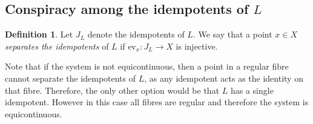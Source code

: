 \documentclass[12pt]{amsart}
\theoremstyle{definition}
\newtheorem{definition}[theorem]{Definition}
\numberwithin{equation}{section}
\newcommand{\ev}{\mathrm{ev}}
\begin{document}
\subsection{Conspiracy among the idempotents of $L$}

\begin{definition}
Let $J_L$ denote the idempotents of $L$.  We say that a point $x\in X$ {\em separates the idempotents} of $L$ if $\ev_x:J_L\to X$ is injective.
\end{definition}
Note that if the system is not equicontinuous, then a 
point in a regular fibre cannot separate the idempotents of $L$, as  any idempotent acts as the identity on that fibre. Therefore, 
the only other option would be that $L$ has a single idempotent. However in this case all fibres are regular and therefore the system is equicontinuous. 
 
\end{document}
